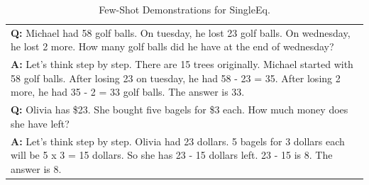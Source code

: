 \documentclass[11pt]{article}
\begin{document}
\begin{table}[ht]
\begin{tabularx}{\textwidth}{X}
    \hdashline
    \textbf{Q: }Michael had 58 golf balls. On tuesday, he lost 23 golf balls. On wednesday, he lost 2 more. How many golf balls did he have at the end of wednesday? \\
    \textbf{A: }Let's think step by step. There are 15 trees originally. Michael started with 58 golf balls. After losing 23 on tuesday, he had 58 - 23 = 35. After losing 2 more, he had 35 - 2 = 33 golf balls. The answer is 33.\\
    \hdashline
    \textbf{Q: }Olivia has \$23. She bought five bagels for \$3 each. How much money does she have left? \\
    \textbf{A: }Let's think step by step. Olivia had 23 dollars. 5 bagels for 3 dollars each will be 5 x 3 = 15 dollars. So she has 23 - 15 dollars left. 23 - 15 is 8. The answer is 8.\\
    \bottomrule
    \end{tabularx}
    \caption{Few-Shot Demonstrations for SingleEq.}
    \label{tab:fs_singleeq}
\end{table}
\end{document}
